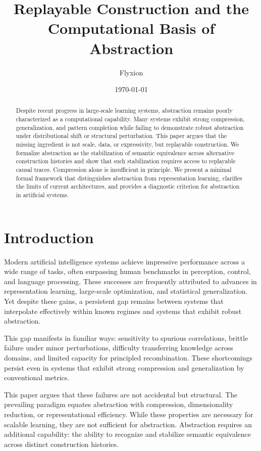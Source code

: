 \documentclass[11pt]{article}
\title{Replayable Construction and the Computational Basis of Abstraction}
\author{Flyxion}
\date{\today}
\begin{document}
\maketitle

\begin{abstract}
Despite recent progress in large-scale learning systems, abstraction remains poorly characterized as a computational capability. Many systems exhibit strong compression, generalization, and pattern completion while failing to demonstrate robust abstraction under distributional shift or structural perturbation. This paper argues that the missing ingredient is not scale, data, or expressivity, but replayable construction. We formalize abstraction as the stabilization of semantic equivalence across alternative construction histories and show that such stabilization requires access to replayable causal traces. Compression alone is insufficient in principle. We present a minimal formal framework that distinguishes abstraction from representation learning, clarifies the limits of current architectures, and provides a diagnostic criterion for abstraction in artificial systems.
\end{abstract}

\section{Introduction}

Modern artificial intelligence systems achieve impressive performance across a wide range of tasks, often surpassing human benchmarks in perception, control, and language processing. These successes are frequently attributed to advances in representation learning, large-scale optimization, and statistical generalization. Yet despite these gains, a persistent gap remains between systems that interpolate effectively within known regimes and systems that exhibit robust abstraction.

This gap manifests in familiar ways: sensitivity to spurious correlations, brittle failure under minor perturbations, difficulty transferring knowledge across domains, and limited capacity for principled recombination. These shortcomings persist even in systems that exhibit strong compression and generalization by conventional metrics.

This paper argues that these failures are not accidental but structural. The prevailing paradigm equates abstraction with compression, dimensionality reduction, or representational efficiency. While these properties are necessary for scalable learning, they are not sufficient for abstraction. Abstraction requires an additional capability: the ability to recognize and stabilize semantic equivalence across distinct construction histories.
\end{document}
